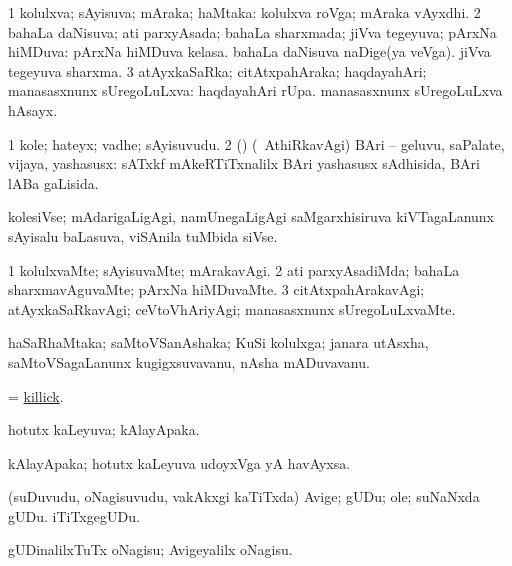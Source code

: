 \bentry
{}
\gl{\gu}
\bmng
\bnum
\num{1} kolulxva; sAyisuva; mAraka; haMtaka:  kolulxva roVga; mAraka vAyxdhi. 
\num{2} bahaLa daNisuva; ati parxyAsada; bahaLa sharxmada; jiVva tegeyuva; pArxNa hiMDuva:  pArxNa hiMDuva kelasa.  bahaLa daNisuva naDige(ya veVga).  jiVva tegeyuva sharxma. 
\num{3} atAyxkaSaRka; citAtxpahAraka; haqdayahAri; manasasxnunx sUregoLuLxva:  haqdayahAri rUpa.  manasasxnunx sUregoLuLxva hAsayx. 
\enum
\emng
\eentry

\bentry
{}
\gl{\nA}
\bmng
\bnum
\num{1} kole; hateyx; vadhe; sAyisuvudu. 
\num{2} (\rUpa) (\kanmu\ AthiRkavAgi) BAri -- geluvu, saPalate, vijaya, yashasusx:  sATxkf mAkeRTiTxnalilx BAri yashasusx sAdhisida, BAri lABa gaLisida. 
\enum
\emng
\eentry

\bentry
{}
\gl{\nA}
\bmng
kolesiVse; mAdarigaLigAgi, namUnegaLigAgi saMgarxhisiruva kiVTagaLanunx sAyisalu baLasuva, viSAnila tuMbida siVse. 
\emng
\eentry

\bentry
{}
\gl{\kirxvi}
\bmng
\bnum
\num{1} kolulxvaMte; sAyisuvaMte; mArakavAgi. 
\num{2} ati parxyAsadiMda; bahaLa sharxmavAguvaMte; pArxNa hiMDuvaMte. 
\num{3} citAtxpahArakavAgi; atAyxkaSaRkavAgi; ceVtoVhAriyAgi; manasasxnunx sUregoLuLxvaMte. 
\enum
\emng
\eentry

\bentry
{}
\gl{\nA}
\bmng
haSaRhaMtaka; saMtoVSanAshaka; KuSi kolulxga; janara utAsxha, saMtoVSagaLanunx kugigxsuvavanu, nAsha mADuvavanu. 
\emng
\eentry

\bentry
{}
\gl{\nA}
\bmng
 = \hyperlink{killick}{killick}. 
\emng
\eentry

\bentry
{}
\gl{\gu}
\bmng
hotutx kaLeyuva; kAlayApaka. 
\emng
\eentry

\bentry
{}
\gl{\nA}
\bmng
kAlayApaka; hotutx kaLeyuva udoyxVga yA havAyxsa. 
\emng
\eentry

\bentry
{}
\gl{\nA}
\bmng
(suDuvudu, oNagisuvudu, \mo vakAkxgi kaTiTxda) Avige; gUDu; ole;  suNaNxda gUDu.  iTiTxgegUDu. 
\emng
\eentry

\bentry
{}
\gl{\sakirx}
\bmng
gUDinalilxTuTx oNagisu; Avigeyalilx oNagisu. 
\emng
\eentry

